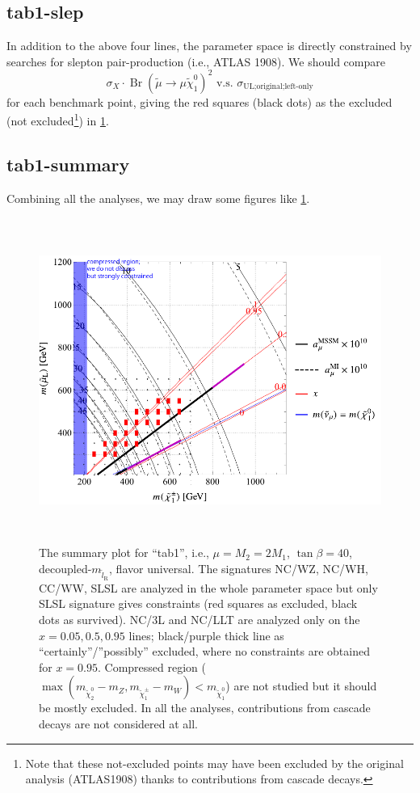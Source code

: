 \documentclass[a4paper,10pt,captions=tableheading,DIV=14]{scrartcl}
\numberwithin{equation}{section}
\newcommand\w[1]{_{\mathrm{#1}}}
\DeclareMathOperator{\Br}{\mathrm{Br}}
\newcommand\neut  [1][\relax]{{\tilde\chi^0_{#1}}}
\newcommand\charPM[1][\relax]{{\tilde\chi^\pm_{#1}}}
\begin{document}
\subsection{tab1-slep}

In addition to the above four lines, the parameter space is directly constrained by searches for slepton pair-production (i.e., ATLAS 1908).
We should compare
\begin{equation}
 \sigma_X\cdot\Br(\tilde\mu\to\mu\neut[1])^2\text{~v.s.~}\sigma_{\text{UL;original;left-only}}
\end{equation}
for each benchmark point, giving the red squares (black dots) as the excluded (not excluded\footnote{Note that these not-excluded points may have been excluded by the original analysis (ATLAS1908) thanks to contributions from cascade decays.}) in \cref{fig:tab1-summary}.

\subsection{tab1-summary}
Combining all the analyses, we may draw some figures like \cref{fig:tab1-summary}.

\begin{figure}[h]\centering
  \includegraphics[height=300pt]{mueqm2.pdf}
  \caption{\label{fig:tab1-summary}The summary plot for ``tab1'', i.e.,
 $\mu=M_2=2M_1$, $\tan\beta=40$, decoupled-$m_{\tilde l\w R}$, flavor universal.
 The signatures NC/WZ, NC/WH, CC/WW, SLSL are analyzed in the whole parameter space but only SLSL signature gives constraints (red squares as excluded, black dots as survived).
 NC/3L and NC/LLT are analyzed only on the $x=0.05, 0.5, 0.95$ lines; black/purple thick line as ``certainly''/''possibly'' excluded, where no constraints are obtained for $x=0.95$.
 Compressed region ($\max(m_{\neut[2]}-m_Z,m_{\charPM[1]}-m_W)<m_{\neut[1]}$) are not studied but  it should be mostly excluded.
 In all the analyses, contributions from cascade decays are not considered at all.
}
\end{figure}
\end{document}
